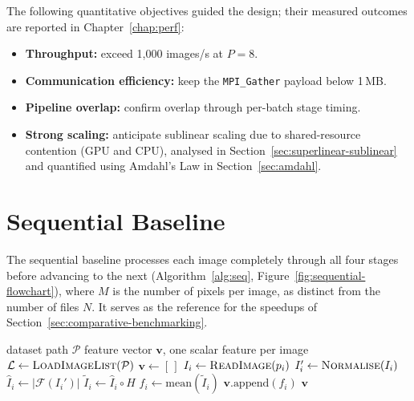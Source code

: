 \documentclass[a4paper,12pt]{report}
\begin{document}
The following quantitative objectives guided the design; their measured outcomes
are reported in Chapter~\ref{chap:perf}:
\begin{itemize}
  \item \textbf{Throughput:} exceed 1{,}000 images/s at $P=8$.
  \item \textbf{Communication efficiency:} keep the \texttt{MPI\_Gather} payload
    below 1\,MB.
  \item \textbf{Pipeline overlap:} confirm overlap through per-batch stage timing.
  \item \textbf{Strong scaling:} anticipate sublinear scaling due to shared-resource
    contention (GPU and CPU), analysed in Section~\ref{sec:superlinear-sublinear} and
    quantified using Amdahl's Law \cite{amdahl1967} in Section~\ref{sec:amdahl}.
\end{itemize}

\section{Sequential Baseline}
\label{sec:seq-baseline}

The sequential baseline processes each image completely through all four
stages before advancing to the next (Algorithm~\ref{alg:seq},
Figure~\ref{fig:sequential-flowchart}), where
$M$ is the number of pixels per image, as distinct from the number of
files $N$.
It serves as the reference for the speedups of
Section~\ref{sec:comparative-benchmarking}.

\begin{algorithm}[H]
\caption{Sequential image-processing pipeline.}
\label{alg:seq}
\begin{algorithmic}[1]
\REQUIRE dataset path $\mathcal{P}$
\ENSURE feature vector $\mathbf{v}$, one scalar feature per image
\STATE $\mathcal{L} \leftarrow \textsc{LoadImageList}(\mathcal{P})$
\STATE $\mathbf{v} \leftarrow [\,]$
  \STATE $I_i \leftarrow \textsc{ReadImage}(p_i)$
  \STATE $I_i' \leftarrow \textsc{Normalise}(I_i)$ 
  \STATE $\hat{I}_i \leftarrow |\mathcal{F}(I_i')|$
  \STATE $\tilde{I}_i \leftarrow \hat{I}_i \circ H$
  \STATE $f_i \leftarrow \text{mean}(\tilde{I}_i)$
  \STATE $\mathbf{v}.\text{append}(f_i)$
\ENDFOR
\RETURN $\mathbf{v}$
\end{algorithmic}
\end{algorithm}
\end{document}
